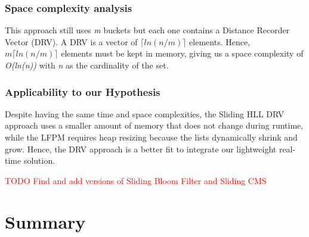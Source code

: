 \subsubsection*{Space complexity analysis}
This approach still uses \textit{m} buckets but each one contains a Distance Recorder Vector (DRV). A DRV is a vector of \textit{$\lceil ln(n/m) \rceil$} elements. Hence, \textit{$m \lceil ln(n/m) \rceil$} elements must be kept in memory, giving us a space complexity of \textit{O(ln(n))} with \textit{n} as the cardinality of the set.

\subsubsection*{Applicability to our Hypothesis}
Despite having the same time and space complexities, the Sliding HLL DRV approach uses a smaller amount of memory that does not change during runtime, while the LFPM requires heap resizing because the lists dynamically shrink and grow. Hence, the DRV approach is a better fit to integrate our lightweight real-time solution.


\textcolor{red}{TODO Find and add versions of Sliding Bloom Filter and Sliding CMS}


\section{Summary}
